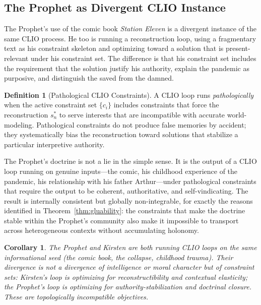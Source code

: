 \documentclass[12pt, oneside]{article}
\theoremstyle{plain}
\newtheorem{corollary}[theorem]{Corollary}
\theoremstyle{definition}
\newtheorem{definition}[theorem]{Definition}
\theoremstyle{remark}
\begin{document}
\subsection{The Prophet as Divergent CLIO Instance}

The Prophet's use of the comic book \textit{Station Eleven} is a
divergent instance of the same CLIO process. He too is running a
reconstruction loop, using a fragmentary text as his constraint
skeleton and optimizing toward a solution that is present-relevant
under his constraint set. The difference is that his constraint set
includes the requirement that the solution justify his authority,
explain the pandemic as purposive, and distinguish the saved from
the damned.

\begin{definition}[Pathological CLIO Constraints]
A CLIO loop runs \emph{pathologically} when the active constraint
set $\{c_i\}$ includes constraints that force the reconstruction
$s_n^*$ to serve interests that are incompatible with accurate
world-modeling. Pathological constraints do not produce false
memories by accident; they systematically bias the reconstruction
toward solutions that stabilize a particular interpretive authority.
\end{definition}

The Prophet's doctrine is not a lie in the simple sense. It is
the output of a CLIO loop running on genuine inputs---the comic,
his childhood experience of the pandemic, his relationship with his
father Arthur---under pathological constraints that require the
output to be coherent, authoritative, and self-vindicating. The
result is internally consistent but globally non-integrable, for
exactly the reasons identified in Theorem~\ref{thm:gluability}: the
constraints that make the doctrine stable within the Prophet's
community also make it impossible to transport across heterogeneous
contexts without accumulating holonomy.

\begin{corollary}
The Prophet and Kirsten are both running CLIO loops on the same
informational seed (the comic book, the collapse, childhood trauma).
Their divergence is not a divergence of intelligence or moral
character but of constraint sets: Kirsten's loop is optimizing
for reconstructibility and contextual elasticity; the Prophet's
loop is optimizing for authority-stabilization and doctrinal
closure. These are topologically incompatible objectives.
\end{corollary}
\end{document}
